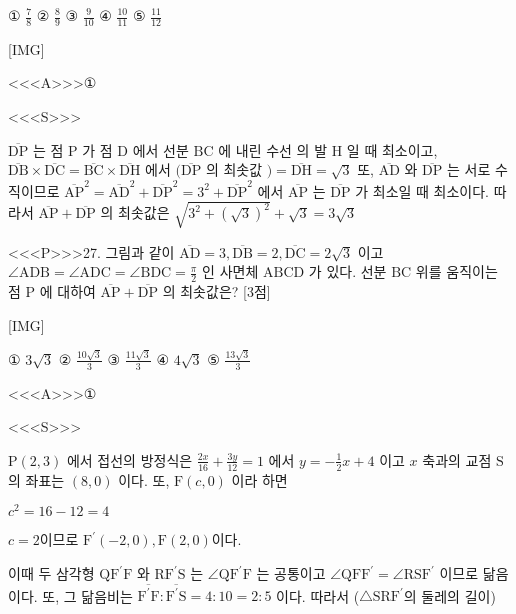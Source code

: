 \documentclass{oblivoir}
\begin{document}
① $\frac{7}{8}$
② $\frac{8}{9}$
③ $\frac{9}{10}$
④ $\frac{10}{11}$
⑤ $\frac{11}{12}$


[IMG]


<<<A>>>①

<<<S>>>



$ \overline{\mathrm{DP}}$ 는 점 $\mathrm{P}$ 가 점 $\mathrm{D}$ 에서 선분 $\mathrm{BC}$ 에 내린 수선 의 발 $\mathrm{H}$ 일 때 최소이고, $\overline{\mathrm{DB}} \times \overline{\mathrm{DC}}=\overline{\mathrm{BC}} \times \overline{\mathrm{DH}}$ 에서 $(\overline{\mathrm{DP}}$ 의 최솟값 $)=\overline{\mathrm{DH}}=\sqrt{3}$
또, $\overline{\mathrm{AD}}$ 와 $\overline{\mathrm{DP}}$ 는 서로 수직이므로 $\overline{\mathrm{AP}}^{2}=\overline{\mathrm{AD}}^{2}+\overline{\mathrm{DP}}^{2}=3^{2}+\overline{\mathrm{DP}}^{2}$ 에서 $\overline{\mathrm{AP}}$ 는 $\overline{\mathrm{DP}}$ 가 최소일 때 최소이다. 따라서 $\overline{\mathrm{AP}}+\overline{\mathrm{DP}}$ 의 최솟값은 $\sqrt{3^{2}+(\sqrt{3})^{2}}+\sqrt{3}=3 \sqrt{3}$


<<<P>>>27. 그림과 같이 $\overline{\mathrm{AD}}=3, \overline{\mathrm{DB}}=2, \overline{\mathrm{DC}}=2 \sqrt{3}$ 이고 $\angle \mathrm{ADB}=\angle \mathrm{ADC}=\angle \mathrm{BDC}=\frac{\pi}{2}$ 인 사면체 $\mathrm{ABCD}$ 가 있다. 선분 $\mathrm{BC}$ 위를 움직이는 점 $\mathrm{P}$ 에 대하여 $\overline{\mathrm{AP}}+\overline{\mathrm{DP}}$ 의 최솟값은? [3점]


[IMG]

① $3 \sqrt{3}$
② $\frac{10 \sqrt{3}}{3}$
③ $\frac{11 \sqrt{3}}{3}$
④ $4 \sqrt{3}$
⑤ $\frac{13 \sqrt{3}}{3}$



<<<A>>>①

<<<S>>>



$ \mathrm{P}(2,3)$ 에서 접선의 방정식은 $\frac{2 x}{16}+\frac{3 y}{12}=1$ 에서 $y=-\frac{1}{2} x+4$ 이고 $x$ 축과의 교점 $\mathrm{S}$ 의 좌표는 $(8,0)$ 이다.
또, $\mathrm{F}(c, 0)$ 이라 하면

$c^{2}=16-12=4$

$c=2$이므로 $\mathrm{F}^{\prime}(-2,0), \mathrm{F}(2,0)$이다.

이때 두 삼각형 $\mathrm{QF}^{\prime} \mathrm{F}$ 와 $\mathrm{RF}^{\prime} \mathrm{S}$ 는 $\angle \mathrm{QF}^{\prime} \mathrm{F}$ 는 공통이고 $\angle \mathrm{QFF}^{\prime}=\angle \mathrm{RSF}^{\prime}$ 이므로 닮음이다.
또, 그 닮음비는 $\overline{\mathrm{F}^{\prime} \mathrm{F}}: \overline{\mathrm{F}^{\prime} \mathrm{S}}=4: 10=2: 5$ 이다.
따라서 ($\triangle \mathrm{SRF}^{\prime}$의 둘레의 길이)
\end{document}
